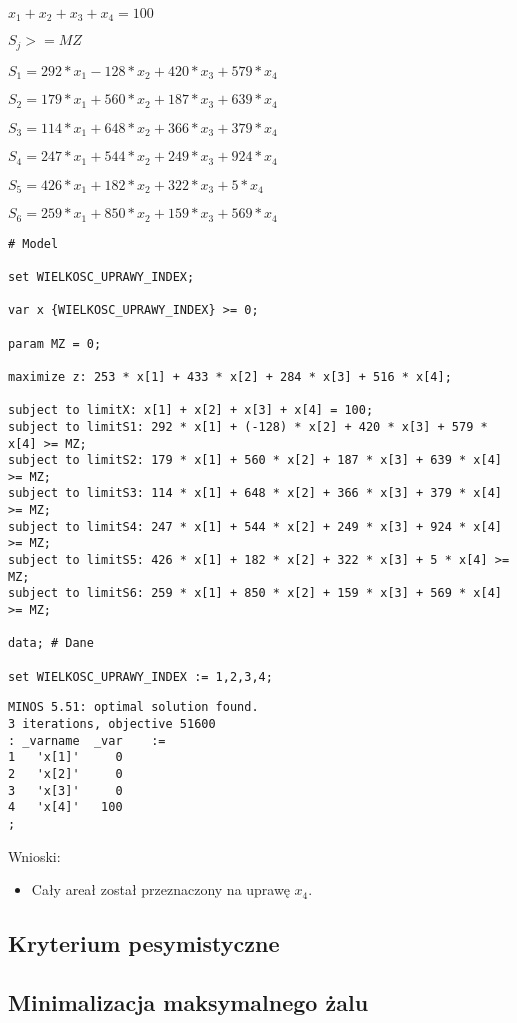 \documentclass{article}
\begin{document}
$x_1 + x_2 + x_3 + x_4 = 100$

$S_j >= MZ$

$S_1 = 292 * x_1 - 128 * x_2 + 420 * x_3 + 579 * x_4$

$S_2 = 179 * x_1 + 560 * x_2 + 187 * x_3 + 639 * x_4$

$S_3 = 114 * x_1 + 648 * x_2 + 366 * x_3 + 379 * x_4$

$S_4 = 247 * x_1 + 544 * x_2 + 249 * x_3 + 924 * x_4$

$S_5 = 426 * x_1 + 182 * x_2 + 322 * x_3 + 5 * x_4$

$S_6 = 259 * x_1 + 850 * x_2 + 159 * x_3 + 569 * x_4$

\lstset{language=AMPL}
\begin{lstlisting}[caption={Model napisany w języku AMPL},label=DescriptiveLabel]
# Model

set WIELKOSC_UPRAWY_INDEX;

var x {WIELKOSC_UPRAWY_INDEX} >= 0;

param MZ = 0;

maximize z: 253 * x[1] + 433 * x[2] + 284 * x[3] + 516 * x[4];

subject to limitX: x[1] + x[2] + x[3] + x[4] = 100;
subject to limitS1: 292 * x[1] + (-128) * x[2] + 420 * x[3] + 579 * x[4] >= MZ;
subject to limitS2: 179 * x[1] + 560 * x[2] + 187 * x[3] + 639 * x[4] >= MZ;
subject to limitS3: 114 * x[1] + 648 * x[2] + 366 * x[3] + 379 * x[4] >= MZ;
subject to limitS4: 247 * x[1] + 544 * x[2] + 249 * x[3] + 924 * x[4] >= MZ;
subject to limitS5: 426 * x[1] + 182 * x[2] + 322 * x[3] + 5 * x[4] >= MZ;
subject to limitS6: 259 * x[1] + 850 * x[2] + 159 * x[3] + 569 * x[4] >= MZ;

data; # Dane

set WIELKOSC_UPRAWY_INDEX := 1,2,3,4;
\end{lstlisting}

\lstset{language=AMPL}
\begin{lstlisting}[caption={Wynik modlu z solwerem MINOS.},label=DescriptiveLabel]
MINOS 5.51: optimal solution found.
3 iterations, objective 51600
: _varname  _var    :=
1   'x[1]'     0
2   'x[2]'     0
3   'x[3]'     0
4   'x[4]'   100
;
\end{lstlisting}

\noindent
Wnioski:

\begin{itemize}
	\item Cały areał został przeznaczony na uprawę $x_4$.
\end{itemize}

\subsection{Kryterium pesymistyczne}

\subsection{Minimalizacja maksymalnego żalu}
\end{document}
